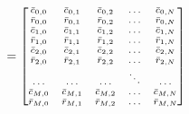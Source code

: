 \documentclass{beamer}
\begin{document}
\begin{frame}
	\begin{align*}
	=
	\scriptsize
	\begin{bmatrix}
	\bar{c}_{0, 0} & \bar{c}_{0, 1} &\bar{c}_{0, 2} & \ldots & \bar{c}_{0, N} \\
	\bar{r}_{0, 0} & \bar{r}_{0, 1} &\bar{r}_{0, 2} & \ldots & \bar{r}_{0, N} \\
	\bar{c}_{1, 0} & \bar{c}_{1, 1} &\bar{c}_{1, 2} & \ldots & \bar{c}_{1, N} \\
	\bar{r}_{1, 0} & \bar{r}_{1, 1} &\bar{r}_{1, 2} & \ldots & \bar{r}_{1, N} \\
	\bar{c}_{2, 0} & \bar{c}_{2, 1} &\bar{c}_{2, 2} & \ldots & \bar{c}_{2, N} \\
	\bar{r}_{2, 0} & \bar{r}_{2, 1} &\bar{r}_{2, 2} & \ldots & \bar{r}_{2, N} \\
	\ldots & \ldots & \ldots & \ddots & \ldots \\
	\bar{c}_{M, 0} & \bar{c}_{M, 1} &\bar{c}_{M, 2} & \ldots & \bar{c}_{M, N} \\
	\bar{r}_{M, 0} & \bar{r}_{M, 1} &\bar{r}_{M, 2} & \ldots & \bar{r}_{M, N}
	\end{bmatrix}
	\end{align*}
\end{frame}
\end{document}
